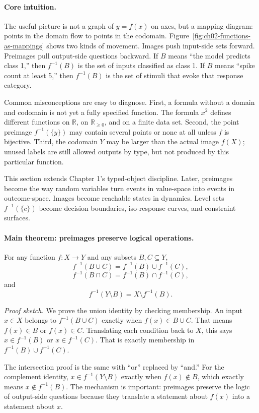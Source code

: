 \paragraph{Core intuition.}
The useful picture is not a graph of \(y=f(x)\) on axes, but a mapping diagram: points in the domain flow to points in the codomain. Figure~\ref{fig:ch02-functions-as-mappings} shows two kinds of movement. Images push input-side sets forward. Preimages pull output-side questions backward. If \(B\) means ``the model predicts class 1,'' then \(f^{-1}(B)\) is the set of inputs classified as class 1. If \(B\) means ``spike count at least 5,'' then \(f^{-1}(B)\) is the set of stimuli that evoke that response category.

Common misconceptions are easy to diagnose. First, a formula without a domain and codomain is not yet a fully specified function. The formula \(x^2\) defines different functions on \(\mathbb{R}\), on \(\mathbb{R}_{\ge 0}\), and on a finite data set. Second, the point preimage \(f^{-1}(\{y\})\) may contain several points or none at all unless \(f\) is bijective. Third, the codomain \(Y\) may be larger than the actual image \(f(X)\); unused labels are still allowed outputs by type, but not produced by this particular function.

This section extends Chapter 1's typed-object discipline. Later, preimages become the way random variables turn events in value-space into events in outcome-space. Images become reachable states in dynamics. Level sets \(f^{-1}(\{c\})\) become decision boundaries, iso-response curves, and constraint surfaces.

\paragraph{Main theorem: preimages preserve logical operations.}
For any function \(f:X\to Y\) and any subsets \(B,C\subseteq Y\),
\[
f^{-1}(B\cup C)=f^{-1}(B)\cup f^{-1}(C),
\]
\[
f^{-1}(B\cap C)=f^{-1}(B)\cap f^{-1}(C),
\]
and
\[
f^{-1}(Y\setminus B)=X\setminus f^{-1}(B).
\]

\emph{Proof sketch.} We prove the union identity by checking membership. An input \(x\in X\) belongs to \(f^{-1}(B\cup C)\) exactly when \(f(x)\in B\cup C\). That means \(f(x)\in B\) or \(f(x)\in C\). Translating each condition back to \(X\), this says \(x\in f^{-1}(B)\) or \(x\in f^{-1}(C)\). That is exactly membership in \(f^{-1}(B)\cup f^{-1}(C)\).

The intersection proof is the same with ``or'' replaced by ``and.'' For the complement identity, \(x\in f^{-1}(Y\setminus B)\) exactly when \(f(x)\notin B\), which exactly means \(x\notin f^{-1}(B)\). The mechanism is important: preimages preserve the logic of output-side questions because they translate a statement about \(f(x)\) into a statement about \(x\).

